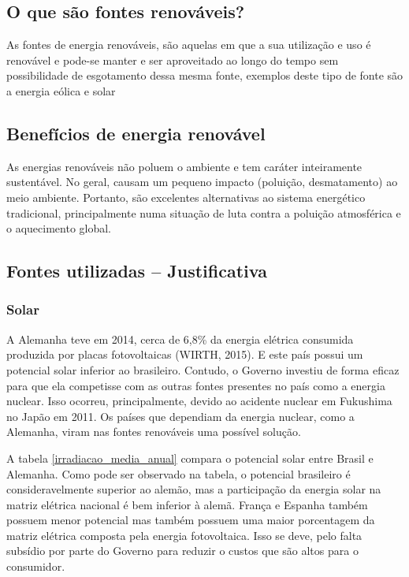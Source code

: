 \subsection{O que são fontes renováveis?}

	As fontes de energia renováveis, são aquelas em que a sua utilização e uso é renovável e pode-se manter e ser aproveitado ao longo do tempo sem possibilidade de esgotamento dessa mesma fonte, exemplos deste tipo de fonte são a energia eólica e solar\cite{2007RevUSP}

\subsection{Benefícios de energia renovável}

	As energias renováveis não poluem o ambiente e tem caráter inteiramente sustentável. No geral, causam um pequeno impacto (poluição, desmatamento) ao meio ambiente. Portanto, são excelentes alternativas ao sistema energético tradicional, principalmente numa situação de luta contra a poluição atmosférica e o aquecimento global.

\subsection{Fontes utilizadas -- Justificativa}
\subsubsection{Solar}

	A Alemanha teve em 2014, cerca de 6,8\% da energia elétrica consumida produzida por placas fotovoltaicas (WIRTH, 2015). E este país possui um potencial solar inferior ao brasileiro. Contudo, o Governo investiu de forma eficaz para que ela competisse com as outras fontes presentes no país como a energia nuclear. Isso ocorreu, principalmente, devido ao acidente nuclear em Fukushima no Japão em 2011. Os países que dependiam da energia nuclear, como a Alemanha, viram nas fontes renováveis uma possível solução.

	A tabela \ref{irradiacao_media_anual} compara o potencial solar entre Brasil e Alemanha. Como pode ser observado na tabela, o potencial brasileiro é consideravelmente superior ao alemão, mas a participação da energia solar na matriz elétrica nacional é bem inferior à alemã. França e Espanha também possuem menor potencial mas também possuem uma maior porcentagem da matriz elétrica composta pela energia fotovoltaica. Isso se deve, pelo falta subsídio por parte do Governo para reduzir o custos que são altos para o consumidor.

